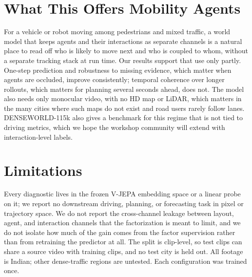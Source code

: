 \documentclass[letterpaper]{article} %
\begin{document}
\section{What This Offers Mobility Agents}

For a vehicle or robot moving among pedestrians and mixed traffic, a world model that keeps agents and their interactions as separate channels is a natural place to read off who is likely to move next and who is coupled to whom, without a separate tracking stack at run time. Our results support that use only partly. One-step prediction and robustness to missing evidence, which matter when agents are occluded, improve consistently; temporal coherence over longer rollouts, which matters for planning several seconds ahead, does not. The model also needs only monocular video, with no HD map or LiDAR, which matters in the many cities where such maps do not exist and road users rarely follow lanes. DENSEWORLD-115k also gives a benchmark for this regime that is not tied to driving metrics, which we hope the workshop community will extend with interaction-level labels.

\section{Limitations}

Every diagnostic lives in the frozen V-JEPA embedding space or a linear probe on it; we report no downstream driving, planning, or forecasting task in pixel or trajectory space. We do not report the cross-channel leakage between layout, agent, and interaction channels that the factorization is meant to limit, and we do not isolate how much of the gain comes from the factor supervision rather than from retraining the predictor at all. The split is clip-level, so test clips can share a source video with training clips, and no test city is held out. All footage is Indian; other dense-traffic regions are untested. Each configuration was trained once.

{\small

}
\end{document}
